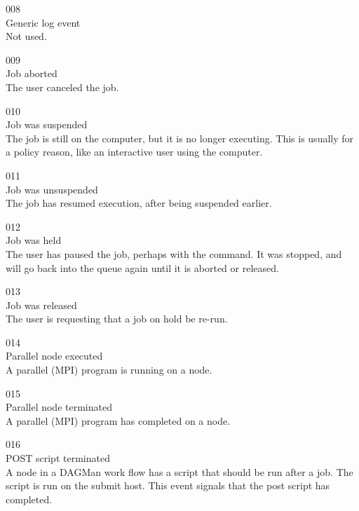 \noindent{} 008 \\
 Generic log event \\
 Not used.

\noindent{} 009 \\
 Job aborted \\
 The user canceled the job.

\noindent{} 010 \\
 Job was suspended \\
 The job is still on the computer, but it is no longer
executing. 
This is usually for a policy reason, like an interactive user using
the computer. 

\noindent{} 011 \\
 Job was unsuspended \\
 The job has resumed execution, after being
suspended earlier. 

\noindent{} 012 \\
 Job was held \\
 The user has paused the job, perhaps with
the  command.
It was stopped, and will go back into the queue again until it is
aborted or released. 

\noindent{} 013 \\
 Job was released \\
 The user is requesting that a job on hold be re-run.

\noindent{} 014 \\
 Parallel node executed \\
 A parallel (MPI) program is running on a node.

\noindent{} 015 \\
 Parallel node terminated \\
 A parallel (MPI) program has completed on a node.

\noindent{} 016 \\
 POST script terminated \\
 A node in a DAGMan work flow has a script
that should be run after a job. 
The script is run on the submit host. 
This event signals that the post script has completed.

